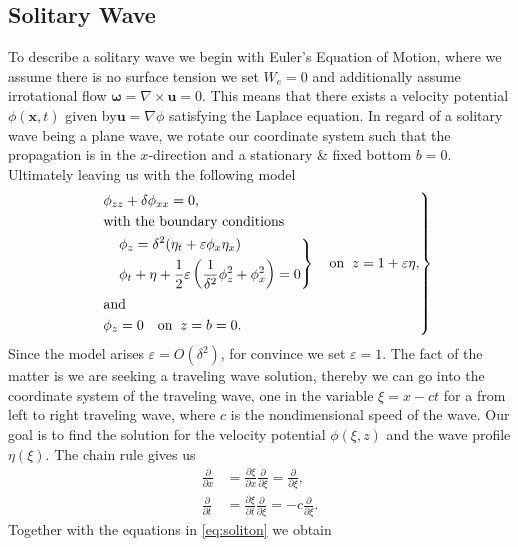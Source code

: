 \subsection{Solitary Wave}
To describe
a solitary wave we begin with Euler's Equation of Motion, where we assume
there is no surface tension we set $W_e = 0$ and additionally assume
irrotational flow $\mathbf{\omega}=\nabla \times  \mathbf{u} = 0$. This means
that there exists a velocity potential $\phi(\mathbf{x},t)$ given
by$\mathbf{u} = \nabla \phi$ satisfying the Laplace equation. In regard of a
solitary wave being a plane wave, we rotate our coordinate system such that
the propagation is in the $x$-direction and a stationary \& fixed bottom
$b=0$. Ultimately leaving us with the following model
\begin{align}\label{eq:soliton}
\begin{drcases}
   & \phi_{zz} + \delta \phi_{x x }  = 0,\\
   &\text{with the boundary conditions}\\
   &\begin{drcases}
    &\phi_z = \delta^2 (\eta_t + \varepsilon \phi_x \eta_x) \\
    &\phi_t + \eta +  \frac{1}{2}\varepsilon\left( \frac{1}{\delta^2}\phi^2_z
    + \phi_x^2\right)  =0
  \end{drcases}\quad \text{on}\;\; z = 1+\varepsilon\eta,\\
   &\text{and}\\
   & \phi_z =0 \quad \text{on}\;\; z = b = 0.
\end{drcases}
\end{align}
Since the model arises $\varepsilon = O(\delta^2)$, for convince we set
$\varepsilon=1$. The fact of the matter is we are seeking a traveling wave
solution, thereby we can go into the coordinate system of the traveling wave,
one in the variable $\xi = x - ct$ for a from left to right traveling wave,
where $c$ is the nondimensional speed of the wave. Our goal is to find the
solution for the velocity potential $\phi(\xi, z)$ and the wave profile
$\eta(\xi)$. The chain rule gives us
\begin{align}
    \frac{\partial }{\partial x} &= \frac{\partial \xi}{\partial x}
    \frac{\partial }{\partial \xi}  = \frac{\partial }{\partial \xi}, \\
    \frac{\partial }{\partial t} &= \frac{\partial \xi}{\partial t}
    \frac{\partial }{\partial \xi}  = -c\frac{\partial }{\partial \xi}.
\end{align}
Together with the equations in \ref{eq:soliton} we obtain
